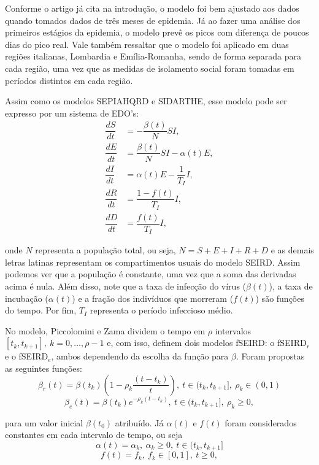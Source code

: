 \documentclass{article}
\begin{document}
Conforme o artigo já cita na introdução, o modelo foi bem ajustado aos dados quando tomados dados de três meses de epidemia. Já ao fazer uma análise dos primeiros estágios da epidemia, o modelo prevê os picos com diferença de poucos dias do pico real. Vale também ressaltar que o modelo foi aplicado em duas regiões italianas, Lombardia e Emília-Romanha, sendo de forma separada para cada região, uma vez que as medidas de isolamento social foram tomadas em períodos distintos em cada região.

Assim como os modelos SEPIAHQRD e SIDARTHE, esse modelo pode ser expresso por um sistema de EDO's:
\begin{equation}
    \label{piccolomini_model}
    \begin{split}
        \dfrac{dS}{dt} & = -\dfrac{\beta(t)}{N}SI, \\
        \dfrac{dE}{dt} & = \dfrac{\beta(t)}{N}SI - \alpha(t) E, \\
        \dfrac{dI}{dt} & = \alpha(t) E - \dfrac{1}{T_I}I, \\
        \dfrac{dR}{dt} & = \dfrac{1 - f(t)}{T_I}I, \\
        \dfrac{dD}{dt} & = \dfrac{f(t)}{T_I}I,
    \end{split}
\end{equation}

\noindent onde $N$ representa a população total, ou seja, $N = S + E + I + R + D$ e as demais letras latinas representam os compartimentos usuais do modelo SEIRD. Assim podemos ver que a população é constante, uma vez que a soma das derivadas acima é nula. Além disso, note que a taxa de infecção do vírus ($\beta(t)$), a taxa de incubação ($\alpha(t)$) e a fração dos indivíduos que morreram ($f(t)$) são funções do tempo. Por fim, $T_I$ representa o período infeccioso médio.

No modelo, Piccolomini e Zama dividem o tempo em $\rho$ intervalos $[t_k, t_{k + 1}], ~k = 0, \dots, \rho -1$ e, com isso, definem dois modelos fSEIRD: o fSEIRD$_r$ e o fSEIRD$_e$, ambos dependendo da escolha da função para $\beta$. Foram propostas as seguintes funções:
\[\beta_r(t) = \beta(t_k)\left(1 - \rho_k\dfrac{(t - t_k)}{t}\right), ~t \in (t_k, t_{k + 1}], ~\rho_k \in (0, 1)\]
\[\beta_e(t) = \beta(t_k)e^{- \rho_k(t - t_k)}, ~t \in (t_k, t_{k + 1}], ~\rho_k \geq 0,\]

\noindent para um valor inicial $\beta(t_0)$ atribuído. Já $\alpha(t)$ e $f(t)$ foram considerados constantes em cada intervalo de tempo, ou seja
\[\alpha(t) = \alpha_k, ~\alpha_k \geq 0, ~t \in (t_k, t_{k + 1}]\]
\[f(t) = f_k, ~f_k \in [0, 1], ~t \geq 0,\]
\end{document}
